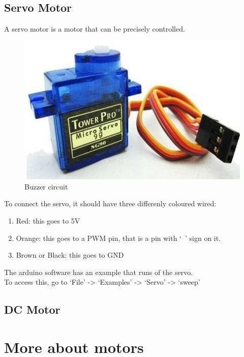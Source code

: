 \documentclass[14pt]{memoir}
\begin{document}
\section*{Servo Motor}
A servo motor is a motor that can be precisely controlled.\\
\begin{figure}[h]
    \includegraphics[width=\linewidth]{./circuit_images/servo_motor.jpg}
    \caption{Buzzer circuit}
\end{figure}

To connect the servo, it should have three differenly coloured
wired:
\begin{enumerate}
    \item Red: this goes to 5V
    \item Orange: this goes to a PWM pin, that is a pin with `~'
        sign on it.
    \item Brown or Black: this goes to GND
\end{enumerate}

The arduino software has an example that runs of the servo.
\\
To access this, go to `File' -> `Examples' -> `Servo' ->
`sweep'
\section*{DC Motor}



\chapter{More about motors}
\end{document}
